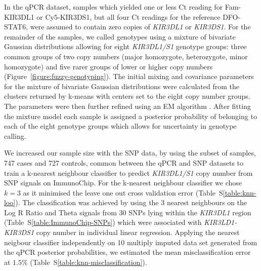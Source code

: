 In the qPCR dataset, samples which yielded one or less Ct reading for Fam-KIR3DL1 or Cy5-KIR3DS1, but all four Ct readings for the reference DFO-STAT6,
were assumed to contain zero copies of \emph{KIR3DL1} or \emph{KIR3DS1}.
For the remainder of the samples, we called genotypes using a mixture of bivariate Gaussian distributions allowing for eight \emph{KIR3DL1/S1} genotype groups:
three common groups of two copy numbers (major homozygote, heterozygote, minor homozygote) and five rarer groups of lower or higher copy numbers (Figure~\ref{figure:fuzzy-genotyping}).
The initial mixing and covariance parameters for the mixture of bivariate Gaussian distributions were calculated from the clusters returned by k-means
with centers set to the eight copy number groups.
The parameters were then further refined using an EM algorithm \citep{mixtools}.
After fitting the mixture model each sample is assigned a posterior probability of belonging to each of the eight genotype groups which allows for uncertainty in genotype calling.

We increased our sample size with the SNP data,
by using the subset of samples, 747 cases and 727 controls, common between the qPCR and SNP datasets to train a k-nearest neighbour classifier
to predict \emph{KIR3DL1/S1} copy number from  SNP signals on ImmunoChip.
For the k-nearest neighbour classifier we chose $k=3$ as it minimised the leave one out cross validation error (Table~S\ref{table:knn-loo}).
The classification was achieved by using the 3 nearest neighbours on the Log R Ratio and Theta signals from 30 SNPs lying within the \emph{KIR3DL1} region (Table~S\ref{table:ImmunoChip-SNPs}) which were associated with \emph{KIR3LD1-KIR3DS1} copy number in individual linear regression.
Applying the nearest neigbour classifier independently on 10 multiply imputed data set generated from the qPCR posterior probabilities,
we estimated the mean misclassification error at $1.5\%$ (Table~S\ref{table:knn-misclassification}). 




